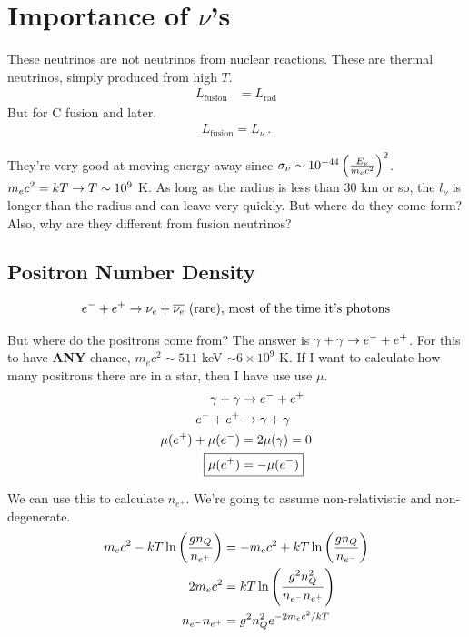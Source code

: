 \section{Importance of $\nu$'s}
These neutrinos are not neutrinos from nuclear reactions. These are thermal neutrinos, simply produced from high $T$. 
\begin{align}
L_{\textrm{fusion}} &= L_{\textrm{rad}}
\end{align}
But for C fusion and later, 
\begin{align}
L_{\textrm{fusion}} = L_{\nu}~.
\end{align}

They're very good at moving energy away since $\sigma_{\nu} \sim 10^{-44} \left( \frac{E_{\nu}}{m_ec^2} \right)^2$. $m_ec^2 = kT \rightarrow T \sim 10^9$ K. %
%
As long as the radius is less than 30 km or so, the $l_\nu$ is longer than the radius and can leave very quickly. But where do they come form? Also, why are they different from fusion neutrinos? 

\subsection{Positron Number Density}%
\begin{align}
e^- + e^+ \rightarrow \nu_e + \overline{\nu_e} \textrm{ (rare), most of the time it's photons}
\end{align}

But where do the positrons come from? The answer is $\gamma + \gamma \rightarrow e^- + e^+$. For this to have \textbf{ANY} chance, $m_ec^2 \sim 511$ keV $\sim 6 \times 10^9$ K. If I want to calculate how many positrons there are in a star, then I have use use $\mu$. 
\begin{align}
\gamma + \gamma &\ra e^- + e^+\\
e^- + e^+ &\ra \gamma + \gamma\\
\mu(e^+) + \mu(e^-) &= 2\mu(\gamma) = 0\\
\Aboxed{\mu(e^+) &= -\mu(e^-)}
\end{align}

We can use this to calculate $n_{e^+}$. We're going to assume non-relativistic and non-degenerate. 
\begin{align}
m_ec^2 - kT\ln \left( \frac{gn_Q}{n_{e^+}} \right) &= -m_ec^2 + kT\ln \left( \frac{gn_Q}{n_{e^-}} \right)\\
2m_ec^2 &= kT \ln \left( \frac{g^2n_Q^2}{n_{e^-} n_{e^+}} \right)\\
n_{e^-}  n_{e^+} &= g^2n_Q^2e^{-2m_ec^2/kT}
\end{align}

